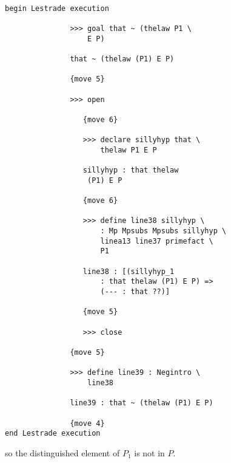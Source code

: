\documentclass[12pt]{article}
\begin{document}
\begin{verbatim}

begin Lestrade execution

               >>> goal that ~ (thelaw P1 \
                   E P)

               that ~ (thelaw (P1) E P)

               {move 5}

               >>> open

                  {move 6}

                  >>> declare sillyhyp that \
                      thelaw P1 E P

                  sillyhyp : that thelaw 
                   (P1) E P

                  {move 6}

                  >>> define line38 sillyhyp \
                      : Mp Mpsubs Mpsubs sillyhyp \
                      linea13 line37 primefact \
                      P1

                  line38 : [(sillyhyp_1 
                      : that thelaw (P1) E P) => 
                      (--- : that ??)]

                  {move 5}

                  >>> close

               {move 5}

               >>> define line39 : Negintro \
                   line38

               line39 : that ~ (thelaw (P1) E P)

               {move 4}
end Lestrade execution
\end{verbatim}

so the distinguished element of $P_1$ is not in $P$.
\end{document}
